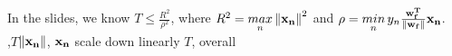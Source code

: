 \documentclass[a4paper,10pt]{article}
\begin{document}
\section{}
In the slides, we know $T \leq \frac{R^{2}}{\rho^{2}}$, where $R^{2}=\underset{n}{max} \left \| \bf{x}_n \right \|^{2} $ and $\rho=\underset{n}{min} \, y_{n}\frac{\bf{w^{T}_{f}}}{\left \| \bf{w}_{f} \right \|}\bf{x}_{n}$.\\
{\MbQ{}},$T${\MbQ{}}$\left \| \bf{x}_n \right \|${\MbQ{}}, {\MaQ{}}$\bf{x}_n$ scale down linearly {\MaQ{}}$T${\MbQ{}}, {\MbQ{}}overall {\McQ{}}\zZ


\medskip
\end{document}
